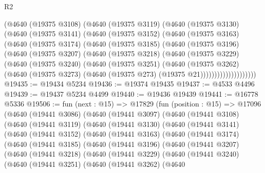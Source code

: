\begin{lexlean}{R2}
\begin{coremodule}
        (@4640
          (@19375 @3108)
          (@4640
            (@19375 @3119)
            (@4640
              (@19375 @3130)
              (@4640
                (@19375 @3141)
                (@4640
                  (@19375 @3152)
                  (@4640
                    (@19375 @3163)
                    (@4640
                      (@19375 @3174)
                      (@4640
                        (@19375 @3185)
                        (@4640
                          (@19375 @3196)
                          (@4640
                            (@19375 @3207)
                            (@4640
                              (@19375 @3218)
                              (@4640
                                (@19375 @3229)
                                (@4640
                                  (@19375 @3240)
                                  (@4640
                                    (@19375 @3251)
                                    (@4640
                                      (@19375 @3262)
                                      (@4640
                                        (@19375 @3273)
                                        (@4640 (@19375 @273) (@19375 @21))))))))))))))))))))
@19435 := @19434 @5234
@19436 := @19374 @19435
@19437 := @4533 @4496
@19439 := @19437 @5234 @4499
@19440 := @19436 @19439
@19441 := @16778 @5336
@19506 := fun (next : @15) =>
  @17829
    (fun (position : @15) =>
    @17096
      (@4640
        (@19441 @3086)
        (@4640
          (@19441 @3097)
          (@4640
            (@19441 @3108)
            (@4640
              (@19441 @3119)
              (@4640
                (@19441 @3130)
                (@4640
                  (@19441 @3141)
                  (@4640
                    (@19441 @3152)
                    (@4640
                      (@19441 @3163)
                      (@4640
                        (@19441 @3174)
                        (@4640
                          (@19441 @3185)
                          (@4640
                            (@19441 @3196)
                            (@4640
                              (@19441 @3207)
                              (@4640
                                (@19441 @3218)
                                (@4640
                                  (@19441 @3229)
                                  (@4640
                                    (@19441 @3240)
                                    (@4640
                                      (@19441 @3251)
                                      (@4640
                                        (@19441 @3262)
                                        (@4640

\end{coremodule}
\end{lexlean}
